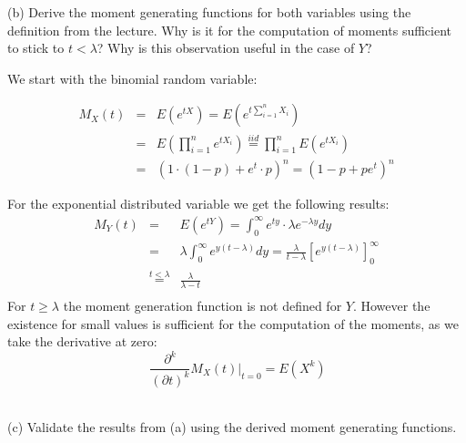 \documentclass[11pt]{article}
\newenvironment{loesung}{}{}          %
\begin{document}
\item[(b)] Derive the moment generating functions for both variables using the definition from the lecture. Why is it for the computation of moments sufficient to stick to $t < \lambda$? Why is this observation useful in the case of $Y$?

\begin{loesung}\vspace{0.2cm}
We start with the binomial random variable:

\begin{eqnarray*}
 M_X(t) & = & E(e^{tX}) = E(e^{t \sum_{i=1}^n X_i})\\
 & = & E(\prod_{i=1}^n e^{tX_i}) \stackrel{iid}{=} \prod_{i=1}^n E(e^{tX_i})\\
 & = & (1 \cdot (1-p) + e^t \cdot p)^n=(1-p+pe^t)^n
\end{eqnarray*}

For the exponential distributed variable we get the following results:
\begin{eqnarray*}
 M_Y(t) & = & E(e^{tY}) = \int_0^{\infty} e^{ty} \cdot \lambda e^{-\lambda y}dy\\
 & = & \lambda \int_0^{\infty} e^{y(t-\lambda )}dy = \frac{\lambda}{t-\lambda} \left[ e^{y(t-\lambda )} \right]_0^{\infty} \\
 & \stackrel{t<\lambda}{=} &  \frac{\lambda}{\lambda-t}  \\
\end{eqnarray*}
For $t \geq \lambda $ the moment generation function is not defined for $Y$. However the existence for small values is sufficient for the computation of the moments, as we take the derivative at zero: \[\  \frac{\partial^k}{(\partial t)^k}M_X(t)\bigg|_{t=0} = E(X^k) \]\  
\end{loesung}

\item[(c)] Validate the results from (a) using the derived moment generating functions.
\end{document}
